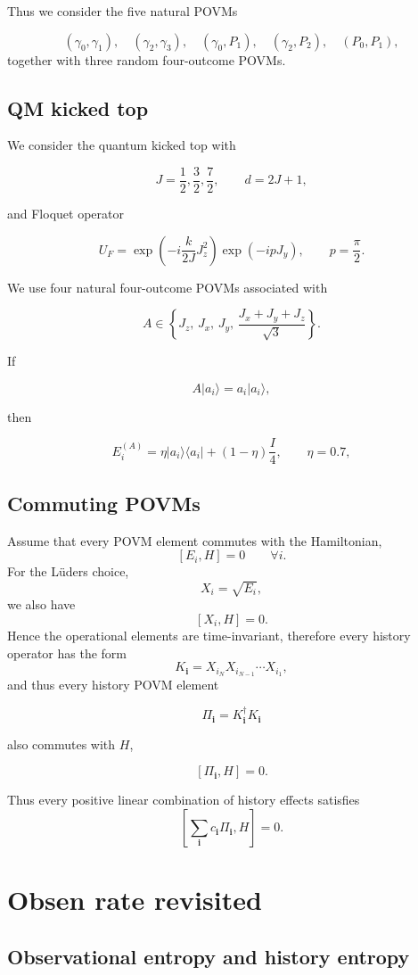 \documentclass{article}
\begin{document}
Thus we consider the five natural POVMs

$$
(\gamma_0,\gamma_1),\quad
(\gamma_2,\gamma_3),\quad
(\gamma_0,P_1),\quad
(\gamma_2,P_2),\quad
(P_0,P_1),
$$
together with three random four-outcome POVMs.
\subsection{QM kicked top}
We consider the quantum kicked top with

$$
J=\frac12,\frac32,\frac72 ,\qquad d=2J+1,
$$

and Floquet operator

$$
U_F=
\exp\!\left(-i\frac{k}{2J}J_z^2\right)
\exp(-ipJ_y),
\qquad p=\frac{\pi}{2}.
$$

We use four natural four-outcome POVMs associated with

$$
A\in
\left\{J_z,\,J_x,\,J_y,\,\frac{J_x+J_y+J_z}{\sqrt3}
\right\}.
$$

If

$$
A|a_i\rangle=a_i|a_i\rangle,
$$

then

$$
E_i^{(A)}
=
\eta |a_i\rangle\langle a_i|
+
(1-\eta)\frac{I }{4},
\qquad
\eta=0.7,
$$
\subsection{Commuting POVMs}
Assume that every POVM element commutes with the Hamiltonian,
$$
[E_i,H]=0
\qquad\forall i.
$$
For the Lüders choice,
$$
X_i=\sqrt{E_i},
$$
we also have
$$
[X_i,H]=0.
$$
Hence the operational elements are time-invariant, therefore every history operator has the form
$$
K_{\mathbf i}
=
X_{i_N}X_{i_{N-1}}\cdots X_{i_1},
$$
and thus every history POVM element

$$
\Pi_{\mathbf i}
=
K_{\mathbf i}^\dagger K_{\mathbf i}
$$

also commutes with \(H\),

$$
[\Pi_{\mathbf i},H]=0.
$$

Thus every positive linear combination of history effects satisfies
$$
\left[
\sum_{\mathbf i}c_{\mathbf i}\Pi_{\mathbf i},
H
\right]=0.
$$

\section{Obsen rate revisited}

\subsection{Observational entropy and history entropy}
\end{document}
